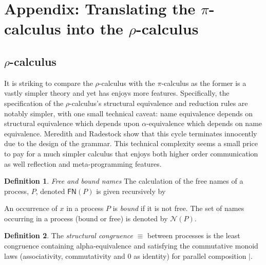 \documentclass[submission,copyright,creativecommons]{eptcs}
\newcommand{\pic}{$\pi$-calculus}
\newcommand{\pzero}{\mathbin{0}}
\newcommand{\names}[1]{\mathbin{\mathcal{N}(#1)}}
\newcommand{\freenames}[1]{\mathbin{\mathsf{FN}(#1)}}
\newcommand{\bc}{\mathbin{\mathbf{::=}}}
\newcommand{\bm}{\mathbin{\mathbf\mid}}
\newcommand{\rhoc}{$\rho$-calculus}
\theoremstyle{definition}
\newtheorem{definition}{Definition}
\theoremstyle{remark}
\theoremstyle{remark}
\begin{document}
\section{Appendix: Translating the {\pic} into the {\rhoc}} \label{appendix:pic2rhoc}
\subsection{\rhoc}

It is striking to compare the {\rhoc} with the {\pic} as the former is
a vastly simpler theory and yet has enjoys more
features. Specifically, the specification of the {\rhoc}'s structural
equivalence and reduction rules are notably simpler, with one small
technical caveat: name equivalence depends on structural equivalence
which depends upon $\alpha$-equivalence which depends on name
equivalence. Meredith and Radestock show that this cycle terminates
innocently due to the design of the grammar. This technical complexity
seems a small price to pay for a much simpler calculus that enjoys
both higher order communication as well reflection and meta-programming
features.


\begin{definition}
\emph{Free and bound names} The calculation of the free names of a
process, $P$, denoted $\freenames{P}$ is given recursively by


An occurrence of $x$ in a process $P$ is \textit{bound} if it is not
free. The set of names occurring in a process (bound or free) is
denoted by $\names{P}$.
\end{definition}

\begin{definition}
  The {\em structural congruence} $\equiv$
  between processes \cite{SangiorgiWalker} is the least congruence containing
  alpha-equivalence and satisfying the commutative monoid laws
  (associativity, commutativity and $\pzero$ as identity) for parallel
  composition $|$.
\end{definition}
\end{document}

